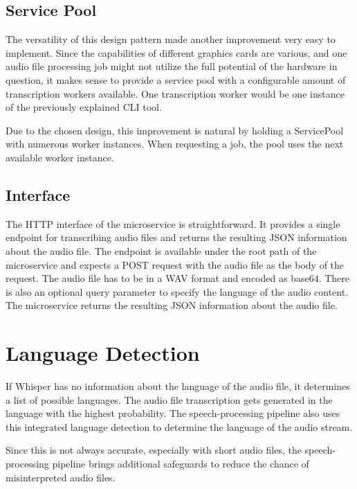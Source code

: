 \subsection{Service Pool}

The versatility of this design pattern made another improvement very easy to implement. Since the capabilities of 
different graphics cards are various, and one audio file processing job might not utilize the full potential of the 
hardware in question, it makes sense to provide a service pool with a configurable amount of transcription workers 
available. One transcription worker would be one instance of the previously explained CLI tool.

Due to the chosen design, this improvement is natural by holding a ServicePool with numerous worker instances. When 
requesting a job, the pool uses the next available worker instance.

\subsection{Interface}

The HTTP interface of the microservice is straightforward. It provides a single endpoint for transcribing audio files 
and returns the resulting JSON information about the audio file. The endpoint is available under the root path of the 
microservice and expects a POST request with the audio file as the body of the request. The audio file has to be in a 
WAV format and encoded as base64. There is also an optional query parameter to specify the language of the audio 
content. The microservice returns the resulting JSON information about the audio file.


\section{Language Detection}

If Whisper has no information about the language of the audio file, it determines a list of possible languages. The 
audio file transcription gets generated in the language with the highest probability. The speech-processing pipeline 
also uses this integrated language detection to determine the language of the audio stream.

Since this is not always accurate, especially with short audio files, the speech-processing pipeline brings additional 
safeguards to reduce the chance of misinterpreted audio files.

